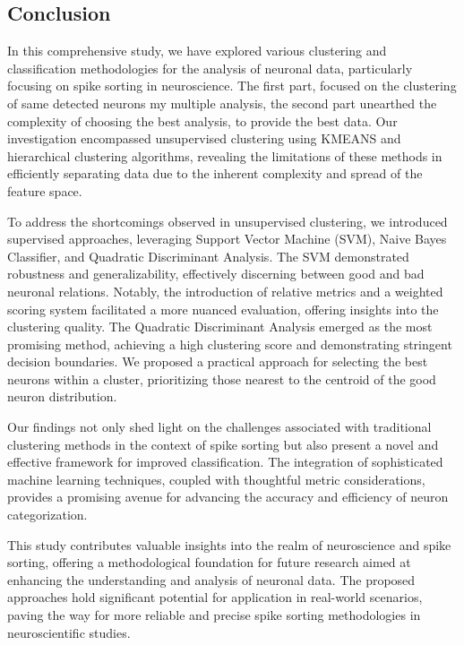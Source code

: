 \documentclass[11pt,a4paper]{report}
\begin{document}
\begin{multicols}{2}
    \chapter*{Conclusion}
    In this comprehensive study, we have explored various clustering and classification methodologies for the analysis of neuronal data, particularly focusing on spike sorting in neuroscience. The first part, focused on the clustering of same detected neurons my multiple analysis, the second part unearthed the complexity of choosing the best analysis, to provide the best data. Our investigation encompassed unsupervised clustering using KMEANS and hierarchical clustering algorithms, revealing the limitations of these methods in efficiently separating data due to the inherent complexity and spread of the feature space.

    To address the shortcomings observed in unsupervised clustering, we introduced supervised approaches, leveraging Support Vector Machine (SVM), Naive Bayes Classifier, and Quadratic Discriminant Analysis. The SVM demonstrated robustness and generalizability, effectively discerning between good and bad neuronal relations. Notably, the introduction of relative metrics and a weighted scoring system facilitated a more nuanced evaluation, offering insights into the clustering quality.
    The Quadratic Discriminant Analysis emerged as the most promising method, achieving a high clustering score and demonstrating stringent decision boundaries. We proposed a practical approach for selecting the best neurons within a cluster, prioritizing those nearest to the centroid of the good neuron distribution.

    Our findings not only shed light on the challenges associated with traditional clustering methods in the context of spike sorting but also present a novel and effective framework for improved classification. The integration of sophisticated machine learning techniques, coupled with thoughtful metric considerations, provides a promising avenue for advancing the accuracy and efficiency of neuron categorization.

    This study contributes valuable insights into the realm of neuroscience and spike sorting, offering a methodological foundation for future research aimed at enhancing the understanding and analysis of neuronal data. The proposed approaches hold significant potential for application in real-world scenarios, paving the way for more reliable and precise spike sorting methodologies in neuroscientific studies.
\end{multicols}
\printbibliography
\end{document}
